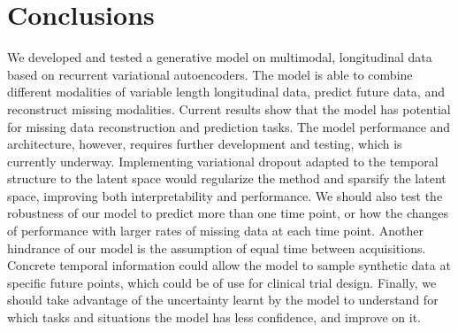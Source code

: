 \section{Conclusions}
\label{rnn:conclusions}

We developed and tested a generative model on multimodal, longitudinal data based on recurrent variational autoencoders. The model is able to combine different modalities of variable length longitudinal data, predict future data, and reconstruct missing modalities. Current results show that the model has potential for missing data reconstruction and prediction tasks. The model performance and architecture, however, requires further development and testing, which is currently underway. Implementing variational dropout adapted to the temporal structure to the latent space would regularize the method and sparsify the latent space, improving both interpretability and performance. We should also test the robustness of our model to predict more than one time point, or how the changes of performance with larger rates of missing data at each time point. Another hindrance of our model is the assumption of equal time between acquisitions. Concrete temporal information could allow the model to sample synthetic data at specific future points, which could be of use for clinical trial design. Finally, we should take advantage of the uncertainty learnt by the model to understand for which tasks and situations the model has less confidence, and improve on it.  \\